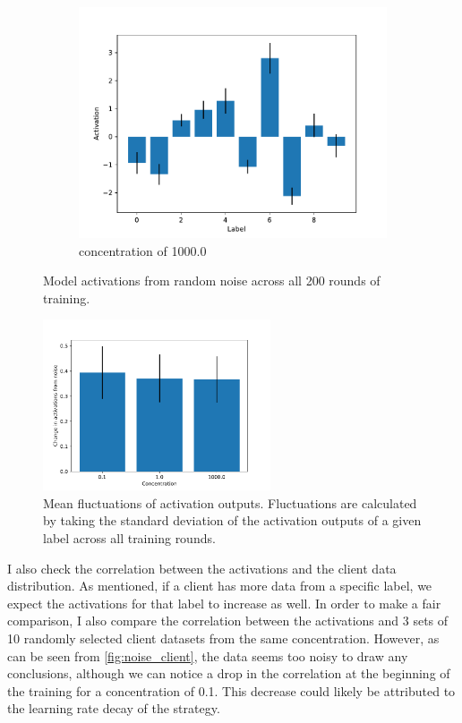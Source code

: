 \documentclass{article}
\begin{document}
\begin{figure}
\begin{subfigure}[b]{0.32\textwidth}
    \centering
    \includegraphics[width=\textwidth]{images/noise_activations_by_label_1000.0.pdf}
    \caption{concentration of 1000.0}
    \label{fig:noise_activations_1000.0}
  \end{subfigure}

  \caption{Model activations from random noise across all 200 rounds of training.}
  \label{fig:noise_activations}
\end{figure}

\begin{figure}
  \centering
  \includegraphics[width=0.6\textwidth]{images/noise_activation_change.pdf}
  \caption{Mean fluctuations of activation outputs. Fluctuations are calculated by taking the standard deviation of the activation outputs of a given label across all training rounds.}
  \label{fig:fluct}
\end{figure}

I also check the correlation between the activations and the client data distribution. As mentioned, if a client has more data from a specific label, we expect the activations for that label to increase as well. In order to make a fair comparison, I also compare the correlation between the activations and 3 sets of 10 randomly selected client datasets from the same concentration. However, as can be seen from \cref{fig:noise_client}, the data seems too noisy to draw any conclusions, although we can notice a drop in the correlation at the beginning of the training for a concentration of 0.1. This decrease could likely be attributed to the learning rate decay of the strategy.
\end{document}
